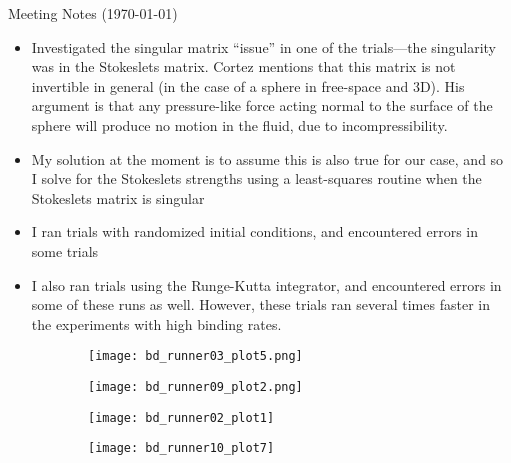 \documentclass{article}
\begin{document}
\pagestyle{plain}

\begin{center}
  {\Large Meeting Notes (\today)}
\end{center}

\begin{itemize}
\item Investigated the singular matrix ``issue'' in one of the
  trials---the singularity was in the Stokeslets matrix. Cortez
  mentions that this matrix is not invertible in general (in the case
  of a sphere in free-space and 3D). His argument is that any
  pressure-like force acting normal to the surface of the sphere will
  produce no motion in the fluid, due to incompressibility.
\item My solution at the moment is to assume this is also true for
  our case, and so I solve for the Stokeslets strengths using a
  least-squares routine when the Stokeslets matrix is singular
\item I ran trials with randomized initial conditions, and encountered
  errors in some trials
\item I also ran trials using the Runge-Kutta integrator, and
  encountered errors in some of these runs as well. However, these
  trials ran several times faster in the experiments with high binding
  rates.
\end{itemize}

\begin{figure}[h]
  \centering
  \begin{subfigure}{0.49\textwidth}
    \texttt{[image: bd\_runner03\_plot5.png]}
  \end{subfigure}
  \hfill
  \begin{subfigure}{0.49\textwidth}
    \texttt{[image: bd\_runner09\_plot2.png]}
  \end{subfigure}
  \label{fig:traj03}
\end{figure}

\begin{figure}
  \centering
  \begin{subfigure}{0.49\textwidth}
    \texttt{[image: bd\_runner02\_plot1]}
  \end{subfigure}
  \hfill
  \begin{subfigure}{0.49\textwidth}
    \texttt{[image: bd\_runner10\_plot7]}
  \end{subfigure}  
  \label{fig:traj02}
\end{figure}
\end{document}
